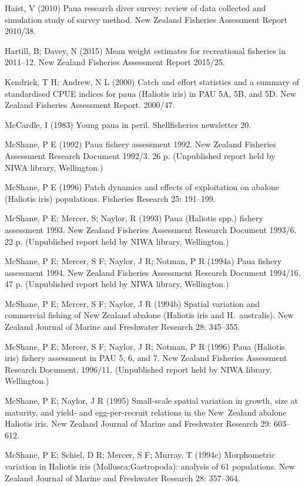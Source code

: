 \documentclass{mpi-plenary}
\theoremstyle{definition}
\theoremstyle{definition}
\theoremstyle{definition}
\theoremstyle{remark}
\begin{document}
Haist, V (2010) Paua research diver survey: review of data collected and
simulation study of survey method. New Zealand Fisheries Assessment
Report 2010/38.

Hartill, B; Davey, N (2015) Mean weight estimates for recreational
fisheries in 2011--12. New Zealand Fisheries Assessment Report 2015/25.

Kendrick, T H; Andrew, N L (2000) Catch and effort statistics and a
summary of standardised CPUE indices for paua (Haliotis iris) in PAU 5A,
5B, and 5D. New Zealand Fisheries Assessment Report. 2000/47.

McCardle, I (1983) Young paua in peril. Shellfisheries newsletter 20.

McShane, P E (1992) Paua fishery assessment 1992. New Zealand Fisheries
Assessment Research Document 1992/3. 26 p. (Unpublished report held by
NIWA library, Wellington.)

McShane, P E (1996) Patch dynamics and effects of exploitation on
abalone (Haliotis iris) populations. Fisheries Research 25: 191--199.

McShane, P E; Mercer, S; Naylor, R (1993) Paua (Haliotis spp.) fishery
assessment 1993. New Zealand Fisheries Assessment Research Document
1993/6. 22 p. (Unpublished report held by NIWA library, Wellington.)

McShane, P E; Mercer, S F; Naylor, J R; Notman, P R (1994a) Paua fishery
assessment 1994. New Zealand Fisheries Assessment Research Document
1994/16. 47 p. (Unpublished report held by NIWA library, Wellington.)

McShane, P E; Mercer, S F; Naylor, J R (1994b) Spatial variation and
commercial fishing of New Zealand abalone (Haliotis iris and
H.~australis). New Zealand Journal of Marine and Freshwater Research 28:
345--355.

McShane, P E; Mercer, S F; Naylor, J R; Notman, P R (1996) Paua
(Haliotis iris) fishery assessment in PAU 5, 6, and 7. New Zealand
Fisheries Assessment Research Document. 1996/11. (Unpublished report
held by NIWA library, Wellington.)

McShane, P E; Naylor, J R (1995) Small-scale spatial variation in
growth, size at maturity, and yield- and egg-per-recruit relations in
the New~Zealand abalone Haliotis iris. New Zealand Journal of Marine and
Freshwater Research 29: 603--612.

McShane, P E; Schiel, D R; Mercer, S F; Murray, T (1994c) Morphometric
variation in Haliotis iris (Mollusca:Gastropoda): analysis of 61
populations. New Zealand Journal of Marine and Freshwater Research 28:
357--364.
\end{document}

